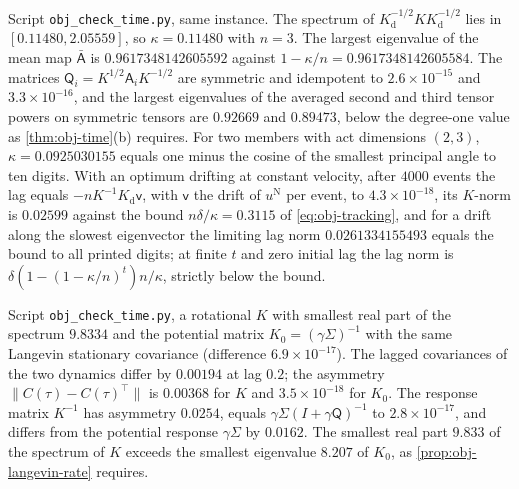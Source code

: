 \begin{numcheck}\label{chk:obj-time}
Script \texttt{obj\_\allowbreak check\_\allowbreak time.py}, same instance. The spectrum of $K_{\mathrm d}^{-1/2}KK_{\mathrm d}^{-1/2}$ lies in $[0.11480,2.05559]$, so $\kappa=0.11480$ with $n=3$. The largest eigenvalue of the mean map $\bar{\mathsf A}$ is $0.9617348142605592$ against $1-\kappa/n=0.9617348142605584$. The matrices $\mathsf Q_i=K^{1/2}\mathsf A_iK^{-1/2}$ are symmetric and idempotent to $2.6\times10^{-15}$ and $3.3\times10^{-16}$, and the largest eigenvalues of the averaged second and third tensor powers on symmetric tensors are $0.92669$ and $0.89473$, below the degree-one value as \cref{thm:obj-time}(b) requires. For two members with act dimensions $(2,3)$, $\kappa=0.0925030155$ equals one minus the cosine of the smallest principal angle to ten digits. With an optimum drifting at constant velocity, after $4000$ events the lag equals $-nK^{-1}K_{\mathrm d}\mathsf v$, with $\mathsf v$ the drift of $u^{\mathrm N}$ per event, to $4.3\times10^{-18}$, its $K$-norm is $0.02599$ against the bound $n\delta/\kappa=0.3115$ of \eqref{eq:obj-tracking}, and for a drift along the slowest eigenvector the limiting lag norm $0.0261334155493$ equals the bound to all printed digits; at finite $t$ and zero initial lag the lag norm is $\delta(1-(1-\kappa/n)^t)n/\kappa$, strictly below the bound.
\end{numcheck}

\begin{numcheck}\label{chk:obj-identification}
Script \texttt{obj\_\allowbreak check\_\allowbreak time.py}, a rotational $K$ with smallest real part of the spectrum $9.8334$ and the potential matrix $K_0=(\gamma\Sigma)^{-1}$ with the same Langevin stationary covariance (difference $6.9\times10^{-17}$). The lagged covariances of the two dynamics differ by $0.00194$ at lag $0.2$; the asymmetry $\lVert C(\tau)-C(\tau)^\top\rVert$ is $0.00368$ for $K$ and $3.5\times10^{-18}$ for $K_0$. The response matrix $K^{-1}$ has asymmetry $0.0254$, equals $\gamma\Sigma(I+\gamma\mathsf Q)^{-1}$ to $2.8\times10^{-17}$, and differs from the potential response $\gamma\Sigma$ by $0.0162$. The smallest real part $9.833$ of the spectrum of $K$ exceeds the smallest eigenvalue $8.207$ of $K_0$, as \cref{prop:obj-langevin-rate} requires.
\end{numcheck}

